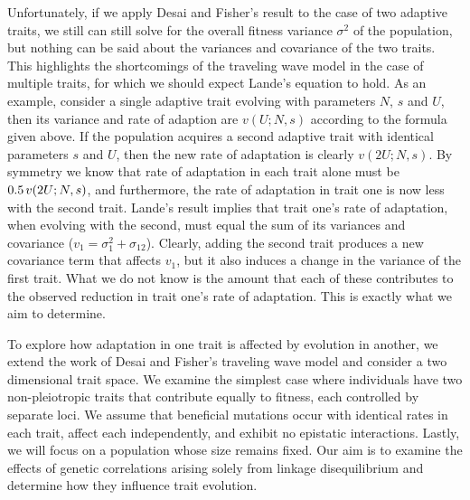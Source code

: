 \documentclass[11pt,twocolumn]{article}
\begin{document}
Unfortunately, if we apply Desai and Fisher's result to the case of two adaptive traits, we still can still solve for the overall fitness variance $\sigma^2$ of the population, but nothing can be said about the variances and covariance of the two traits. This highlights the shortcomings of the traveling wave model in the case of multiple traits, for which we should expect Lande's equation to hold. As an example, consider a single adaptive trait evolving with parameters $N$, $s$ and $U$, then its variance and rate of adaption are $v(U;N,s)$ according to the formula given above. If the population acquires a second adaptive trait with identical parameters $s$ and $U$, then the new rate of adaptation is clearly $v(2U;N,s)$. By symmetry we know that rate of adaptation in each trait alone must be $0.5 \hspace{.02 in} v(2U;N,s)$, and furthermore, the rate of adaptation in trait one is now less with the second trait. Lande's result implies that trait one's rate of adaptation, when evolving with the second, must equal the sum of its variances and covariance ($v_1 =\sigma_1^2 +\sigma_{12}$). Clearly, adding the second trait produces a new covariance term that affects $v_1$, but it also induces a change in the variance of the first trait. What we do not know is the amount that each of these contributes to the observed reduction in trait one's rate of adaptation. This is exactly what we aim to determine. \par
% 
% 
% 

To explore how adaptation in one trait is affected by evolution in another, we extend the work of Desai and Fisher's traveling wave model and consider a two dimensional trait space. We examine the simplest case where individuals have two non-pleiotropic traits that contribute equally to fitness, each controlled by separate loci. We assume that beneficial mutations occur with identical rates in each trait, affect each independently, and exhibit no epistatic interactions.  Lastly, we will focus on a population whose size remains fixed. Our aim is to examine the effects of genetic correlations arising solely from linkage disequilibrium and determine how they influence trait evolution. 
\end{document}
